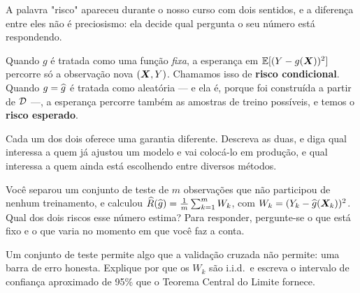 A palavra "risco" apareceu durante o nosso curso com dois sentidos, e a diferença entre eles
não é preciosismo: ela decide qual pergunta o seu número está respondendo.

Quando $g$ é tratada como uma função \emph{fixa}, a esperança em
$\mathbb{E}[(Y-g(\bm{X}))^2]$ percorre só a observação nova $(\bm{X},Y)$. Chamamos isso de
\textbf{risco condicional}. Quando $g=\widehat{g}$ é tratada como aleatória --- e ela é,
porque foi construída a partir de $\mathcal{D}$ ---, a esperança percorre também as
amostras de treino possíveis, e temos o \textbf{risco esperado}.
\begin{itens}
  \item {} Cada um dos dois oferece uma garantia diferente. Descreva as
        duas, e diga qual interessa a quem já ajustou um modelo e vai colocá-lo em
        produção, e qual interessa a quem ainda está escolhendo entre diversos métodos.
  \item {} Você separou um conjunto de teste de $m$ observações que não
        participou de nenhum treinamento, e calculou $\widehat{R}(\widehat{g})=\frac1m\sum_{k=1}^m W_k$,
        com $W_k=(Y_k-\widehat{g}(\bm{X}_k))^2$. Qual dos dois riscos esse número estima?
        Para responder, pergunte-se o que está fixo e o que varia no momento em
        que você faz a conta.
  \item {} Um conjunto de teste permite algo que a validação cruzada não
        permite: uma barra de erro honesta. Explique por que os $W_k$ são i.i.d.\ e
        escreva o intervalo de confiança aproximado de 95\% que o Teorema Central
        do Limite fornece.
\end{itens}

